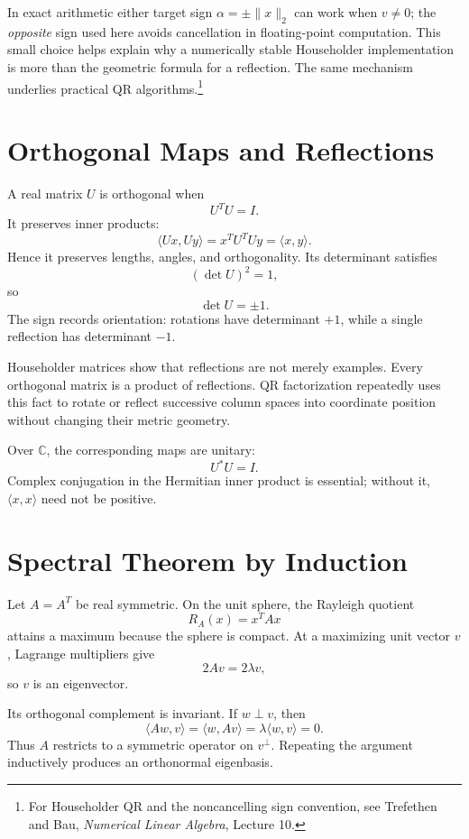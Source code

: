 In exact arithmetic either target sign \(\alpha=\pm\|x\|_2\) can work when \(v\ne0\); the \emph{opposite} sign used here avoids cancellation in floating-point computation. This small choice helps explain why a numerically stable Householder implementation is more than the geometric formula for a reflection. The same mechanism underlies practical QR algorithms.\footnote{For Householder QR and the noncancelling sign convention, see Trefethen and Bau, \emph{Numerical Linear Algebra}, Lecture 10.}

\section{Orthogonal Maps and Reflections}

A real matrix \(U\) is orthogonal when
\[
  U^TU=I.
\]
It preserves inner products:
\[
  \langle Ux,Uy\rangle
  =x^TU^TUy
  =\langle x,y\rangle.
\]
Hence it preserves lengths, angles, and orthogonality.  Its determinant satisfies
\[
  (\det U)^2=1,
\]
so
\[
  \det U=\pm1.
\]
The sign records orientation: rotations have determinant \(+1\), while a single reflection has determinant \(-1\).

Householder matrices show that reflections are not merely examples.  Every orthogonal matrix is a product of reflections.  QR factorization repeatedly uses this fact to rotate or reflect successive column spaces into coordinate position without changing their metric geometry.

Over \(\mathbb C\), the corresponding maps are unitary:
\[
  U^*U=I.
\]
Complex conjugation in the Hermitian inner product is essential; without it, \(\langle x,x\rangle\) need not be positive.

\section{Spectral Theorem by Induction}

Let \(A=A^T\) be real symmetric.  On the unit sphere, the Rayleigh quotient
\[
  R_A(x)=x^TAx
\]
attains a maximum because the sphere is compact.  At a maximizing unit vector \(v\), Lagrange multipliers give
\[
  2Av=2\lambda v,
\]
so \(v\) is an eigenvector.

Its orthogonal complement is invariant.  If \(w\perp v\), then
\[
  \langle Aw,v\rangle
  =\langle w,Av\rangle
  =\lambda\langle w,v\rangle=0.
\]
Thus \(A\) restricts to a symmetric operator on \(v^\perp\).  Repeating the argument inductively produces an orthonormal eigenbasis.

